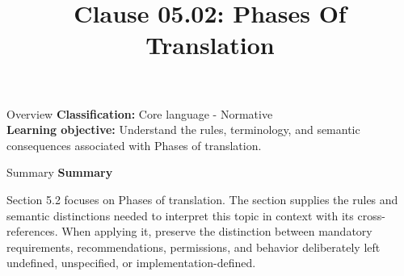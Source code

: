 \documentclass[10pt,letterpaper]{article}
\title{Clause 05.02: Phases Of Translation}
\author{}
\date{}
\begin{document}
\maketitle
\begin{CornellOverviewBox}{Overview}
\textbf{Classification:} Core language - Normative\\[2pt]
\textbf{Learning objective:} Understand the rules, terminology, and semantic consequences associated with Phases of translation.
\end{CornellOverviewBox}\begin{CornellSummaryBox}{Summary}
{\sffamily\bfseries\color{Accent} Summary}\par\vspace{3pt}Section 5.2 focuses on Phases of translation. The section supplies the rules and semantic distinctions needed to interpret this topic in context with its cross-references. When applying it, preserve the distinction between mandatory requirements, recommendations, permissions, and behavior deliberately left undefined, unspecified, or implementation-defined.
\end{CornellSummaryBox}
\end{document}
